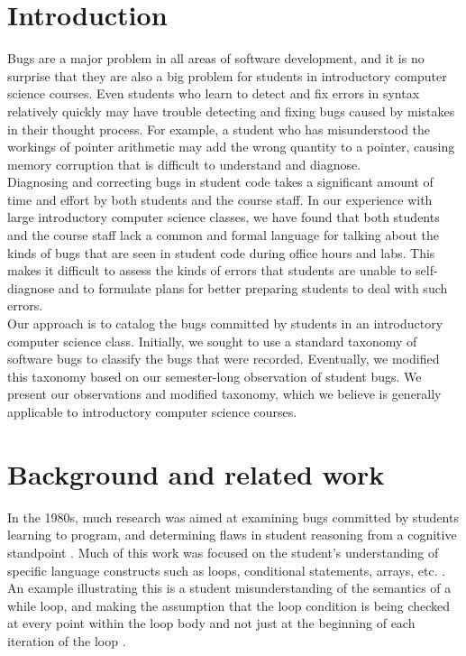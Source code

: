 \documentclass{sig-alternate}
\begin{document}
\section{Introduction}
\label{sec:intro}

Bugs are a major problem in all areas of software development, and it
is no surprise that they are also a big problem for students in
introductory computer science courses. Even students who learn to
detect and fix errors in syntax relatively quickly may have trouble detecting and fixing bugs caused by mistakes in their thought process. For example, a student who has misunderstood the workings of pointer arithmetic may add the wrong quantity to a pointer, causing memory corruption that is difficult to understand and diagnose.\\

Diagnosing and correcting bugs in student code takes a significant
amount of time and effort by both students and the course staff. In our experience with large introductory computer science classes, we have found that both students and the course staff lack a common and formal language for talking about the kinds of bugs that are seen in student code during office hours and labs. This makes it difficult to assess the kinds of errors that students are unable to self-diagnose and to formulate plans for better preparing students to
deal with such errors.\\

Our approach is to catalog the bugs committed by students in an introductory computer science class. Initially, we sought to use a standard taxonomy of software bugs \cite{IEEE10} to classify the bugs that were recorded. Eventually, we modified this taxonomy based on our semester-long observation of student bugs. We present our observations and modified taxonomy, which we believe is generally applicable to introductory computer science courses.

\section{Background and related work}
\label{sec:background}

In the 1980s, much research was aimed at examining bugs committed by students learning to program, and determining flaws in student reasoning from a cognitive standpoint \cite{JoniSolowayGoldmanEhrlich83,  Pea86, PutnamSleemanBaxterKuspa86, SpohrerSoloway86}. Much of this work was focused on the student's understanding of specific language constructs such as loops, conditional statements, arrays, etc. \cite{JoniSolowayGoldmanEhrlich83,  Pea86, PutnamSleemanBaxterKuspa86}. An example illustrating this is a student misunderstanding of the semantics of a while loop, and making the assumption that the loop condition is being checked at every point within the loop body and not just at the beginning of each iteration of the loop \cite{Pea86}.\\
\end{document}
